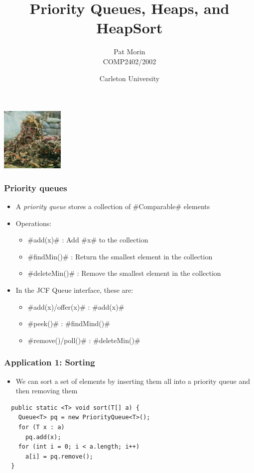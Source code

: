 \documentclass[xcolor=dvipsnames]{beamer}
\title{Priority Queues, Heaps, and HeapSort}
\author{Pat Morin \\ COMP2402/2002}
\date{Carleton University}
\begin{document}
\begin{frame}
  \titlepage
  \begin{center}
    \includegraphics[height=1.2in]{images/heap.jpg}
  \end{center}
\end{frame}

\begin{frame}
  \frametitle{Priority queues}
  \begin{itemize}
    \item<1->A \emph{priority queue} stores a collection of #Comparable# elements
    \item<2->Operations:
    \begin{itemize}
      \item<3-> #add(x)# : Add #x# to the collection
      \item<4-> #findMin()# : Return the smallest element in the collection
      \item<5-> #deleteMin()# : Remove the smallest element in the collection
    \end{itemize}
    \item<6-> In the JCF Queue interface, these are:
    \begin{itemize}
      \item #add(x)/offer(x)# : #add(x)#
      \item #peek()# : #findMind()#
      \item #remove()/poll()# : #deleteMin()#
    \end{itemize}
  \end{itemize}
\end{frame}

\begin{frame}[fragile]
  \frametitle{Application 1: Sorting}

  \begin{itemize}
    \item We can sort a set of elements by inserting them all into a priority queue and then removing them  
  \end{itemize}
\begin{lstlisting}
  public static <T> void sort(T[] a) {
    Queue<T> pq = new PriorityQueue<T>();
    for (T x : a) 
      pq.add(x);
    for (int i = 0; i < a.length; i++)
      a[i] = pq.remove();
  }
\end{lstlisting}
\end{frame}
\end{document}
